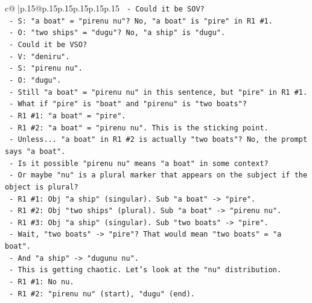 \documentclass{article}
\begin{document}
{\begin{supertabular}{c@{$\;$}|p{.15\linewidth}@{}p{.15\linewidth}p{.15\linewidth}p{.15\linewidth}p{.15\linewidth}p{.15\linewidth}}
{{{\texttt{                  {-} Could it be SOV?} \\
\texttt{                    {-} S: "a boat" = "pirenu nu"? No, "a boat" is "pire" in R1 \#1.} \\
\texttt{                    {-} O: "two ships" = "dugu"? No, "a ship" is "dugu".} \\
\texttt{                  {-} Could it be VSO?} \\
\texttt{                    {-} V: "deniru".} \\
\texttt{                    {-} S: "pirenu nu".} \\
\texttt{                    {-} O: "dugu".} \\
\texttt{                    {-} Still "a boat" = "pirenu nu" in this sentence, but "pire" in R1 \#1.} \\
\texttt{                  {-} What if "pire" is "boat" and "pirenu" is "two boats"?} \\
\texttt{                    {-} R1 \#1: "a boat" = "pire".} \\
\texttt{                    {-} R1 \#2: "a boat" = "pirenu nu". This is the sticking point.} \\
\texttt{                    {-} Unless... "a boat" in R1 \#2 is actually "two boats"? No, the prompt says "a boat".} \\
\texttt{                    {-} Is it possible "pirenu nu" means "a boat" in some context?} \\
\texttt{                    {-} Or maybe "nu" is a plural marker that appears on the subject if the object is plural?} \\
\texttt{                    {-} R1 \#1: Obj "a ship" (singular). Sub "a boat" {-}> "pire".} \\
\texttt{                    {-} R1 \#2: Obj "two ships" (plural). Sub "a boat" {-}> "pirenu nu".} \\
\texttt{                    {-} R1 \#3: Obj "a ship" (singular). Sub "two boats" {-}> "pire".} \\
\texttt{                      {-} Wait, "two boats" {-}> "pire"? That would mean "two boats" = "a boat".} \\
\texttt{                      {-} And "a ship" {-}> "dugunu nu".} \\
\texttt{                      {-} This is getting chaotic. Let's look at the "nu" distribution.} \\
\texttt{                      {-} R1 \#1: No nu.} \\
\texttt{                      {-} R1 \#2: "pirenu nu" (start), "dugu" (end).} \\
}}}
\end{supertabular}}
\end{document}
